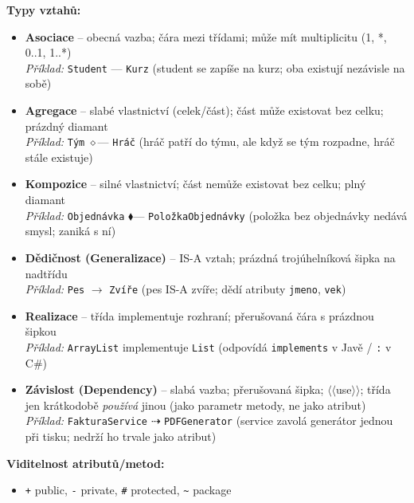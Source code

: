 \textbf{Typy vztahů:}
\begin{itemize}
  \item \textbf{Asociace} -- obecná vazba; čára mezi třídami; může mít multiplicitu (1, *, 0..1, 1..*) \\
    \textit{Příklad:} \texttt{Student} --- \texttt{Kurz} (student se zapíše na kurz; oba existují nezávisle na sobě)

  \item \textbf{Agregace} -- slabé vlastnictví (celek/část); část může existovat bez celku; prázdný diamant \\
    \textit{Příklad:} \texttt{Tým} $\diamond$--- \texttt{Hráč} (hráč patří do týmu, ale když se tým rozpadne, hráč stále existuje)

  \item \textbf{Kompozice} -- silné vlastnictví; část nemůže existovat bez celku; plný diamant \\
    \textit{Příklad:} \texttt{Objednávka} $\blacklozenge$--- \texttt{PoložkaObjednávky} (položka bez objednávky nedává smysl; zaniká s ní)

  \item \textbf{Dědičnost (Generalizace)} -- IS-A vztah; prázdná trojúhelníková šipka na nadtřídu \\
    \textit{Příklad:} \texttt{Pes} $\to$ \texttt{Zvíře} (pes IS-A zvíře; dědí atributy \texttt{jmeno}, \texttt{vek})

  \item \textbf{Realizace} -- třída implementuje rozhraní; přerušovaná čára s prázdnou šipkou \\
    \textit{Příklad:} \texttt{ArrayList} implementuje \texttt{List} (odpovídá \texttt{implements} v Javě / \texttt{:} v C\#)

  \item \textbf{Závislost (Dependency)} -- slabá vazba; přerušovaná šipka; $\langle\langle$use$\rangle\rangle$; třída jen krátkodobě \textit{používá} jinou (jako parametr metody, ne jako atribut) \\
    \textit{Příklad:} \texttt{FakturaService} $\dashrightarrow$ \texttt{PDFGenerator} (service zavolá generátor jednou při tisku; nedrží ho trvale jako atribut)
\end{itemize}

\textbf{Viditelnost atributů/metod:}
\begin{itemize}
  \item \texttt{+} public, \texttt{-} private, \texttt{\#} protected, \texttt{\~} package
\end{itemize}

